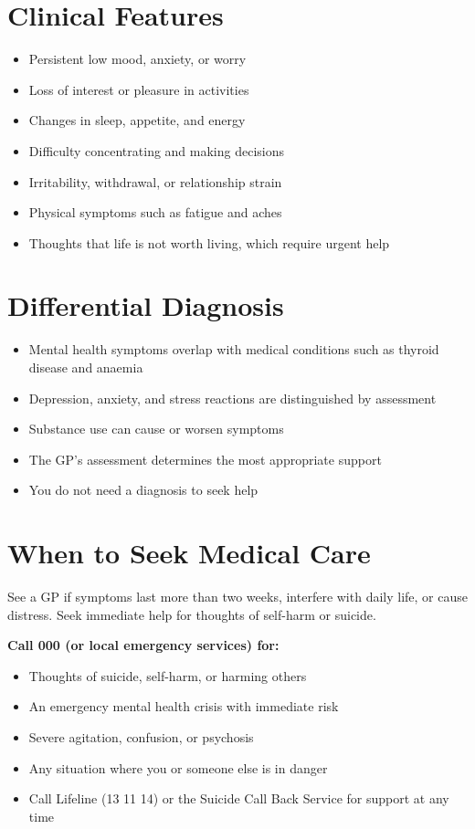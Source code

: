 \section*{Clinical Features}
\begin{itemize}
    \item Persistent low mood, anxiety, or worry
    \item Loss of interest or pleasure in activities
    \item Changes in sleep, appetite, and energy
    \item Difficulty concentrating and making decisions
    \item Irritability, withdrawal, or relationship strain
    \item Physical symptoms such as fatigue and aches
    \item Thoughts that life is not worth living, which require urgent help
\end{itemize}

\section*{Differential Diagnosis}
\begin{itemize}
    \item Mental health symptoms overlap with medical conditions such as thyroid disease and anaemia
    \item Depression, anxiety, and stress reactions are distinguished by assessment
    \item Substance use can cause or worsen symptoms
    \item The GP's assessment determines the most appropriate support
    \item You do not need a diagnosis to seek help
\end{itemize}

\section*{When to Seek Medical Care}
See a GP if symptoms last more than two weeks, interfere with daily life, or cause distress. Seek immediate help for thoughts of self-harm or suicide.

\textbf{Call 000 (or local emergency services) for:}
\begin{itemize}
    \item Thoughts of suicide, self-harm, or harming others
    \item An emergency mental health crisis with immediate risk
    \item Severe agitation, confusion, or psychosis
    \item Any situation where you or someone else is in danger
    \item Call Lifeline (13 11 14) or the Suicide Call Back Service for support at any time
\end{itemize}

